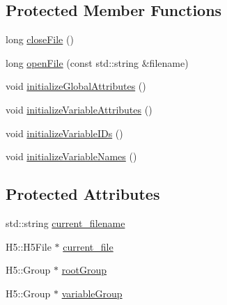 \subsection*{Protected Member Functions}
\begin{DoxyCompactItemize}
\item 
long \hyperlink{classccmc_1_1_h_d_f5_file_reader_a67f6c64b42842dac85a2d63825d28be8}{closeFile} ()
\item 
long \hyperlink{classccmc_1_1_h_d_f5_file_reader_ab77b5d7f5d7e8d3ac0dfac8758441974}{openFile} (const std::string \&filename)
\item 
void \hyperlink{classccmc_1_1_h_d_f5_file_reader_a8f2f2d119e4f7ef8fca38d9977d46586}{initializeGlobalAttributes} ()
\item 
void \hyperlink{classccmc_1_1_h_d_f5_file_reader_a0e8d988b4b07e9d9d842a52eeebc6d7c}{initializeVariableAttributes} ()
\item 
void \hyperlink{classccmc_1_1_h_d_f5_file_reader_ab0255720c8996540dcffbdc7a7a8f76c}{initializeVariableIDs} ()
\item 
void \hyperlink{classccmc_1_1_h_d_f5_file_reader_ad38b7dce075a9bafbd48d10e25a92261}{initializeVariableNames} ()
\end{DoxyCompactItemize}
\subsection*{Protected Attributes}
\begin{DoxyCompactItemize}
\item 
std::string \hyperlink{classccmc_1_1_h_d_f5_file_reader_a5da3b247b15096662a5c13d1ba5c7834}{current\_\-filename}
\item 
H5::H5File $\ast$ \hyperlink{classccmc_1_1_h_d_f5_file_reader_aeee4da6197287cede72ac14784ff2d8f}{current\_\-file}
\item 
H5::Group $\ast$ \hyperlink{classccmc_1_1_h_d_f5_file_reader_ab625127a9cb1f09262ba79874c4479ba}{rootGroup}
\item 
H5::Group $\ast$ \hyperlink{classccmc_1_1_h_d_f5_file_reader_a8030944befcec51a0cca62bacee4ac47}{variableGroup}
\end{DoxyCompactItemize}


